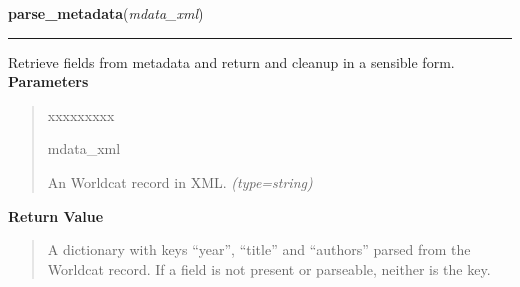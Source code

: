     \label{biblio:webquery:worldcat:parse_metadata}

    \vspace{0.5ex}

\hspace{.8\funcindent}\begin{boxedminipage}{\funcwidth}

    \raggedright \textbf{parse\_metadata}(\textit{mdata\_xml})

    \vspace{-1.5ex}

    \rule{\textwidth}{0.5\fboxrule}
\setlength{\parskip}{2ex}

Retrieve fields from metadata and return and cleanup in a sensible form.
\setlength{\parskip}{1ex}
      \textbf{Parameters}
      \vspace{-1ex}

      \begin{quote}
        \begin{Ventry}{xxxxxxxxx}

          \item[mdata\_xml]


An Worldcat record in XML.
            {\it (type=string)}

        \end{Ventry}

      \end{quote}

      \textbf{Return Value}
    \vspace{-1ex}

      \begin{quote}

A dictionary with keys ``year'', ``title'' and ``authors'' parsed from the
Worldcat record. If a field is not present or parseable, neither is
the key.
      \end{quote}

    \end{boxedminipage}

    \label{biblio:webquery:worldcat:parse_title}

    \vspace{0.5ex}

